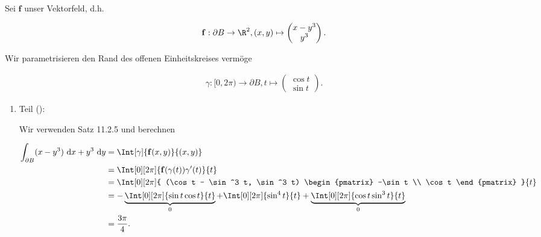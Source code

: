 \begin{solution}

Sei $\mathbf f$ unser Vektorfeld, d.h.

\begin{align*}
    \mathbf f:
        \partial B \to \R^2,
        (x, y)
        \mapsto
        \begin{pmatrix}
            x - y^3 \\ y^3
        \end{pmatrix}.
\end{align*}

Wir parametrisieren den Rand des offenen Einheitskreises vermöge

\begin{align*}
    \gamma:
        [0, 2 \pi) \to \partial B,
        t
        \mapsto
        \begin{pmatrix}
            \cos t \\ \sin t
        \end{pmatrix}.
\end{align*}

\begin{enumerate}[label = \arabic*.]

    \item Teil ():
    
    
    Wir verwenden Satz 11.2.5 und berechnen

    \begin{align*}
        \int_{\partial B}
        (x - y^3)
        ~\mathrm d x
    +
    y^3
    ~\mathrm d y
    & =
    \Int[\gamma]
    {
        \mathbf f(x, y)
    }{(x, y)} \\
    & =
    \Int[0][2 \pi]
    {
        \mathbf f(\gamma(t)) \gamma^\prime(t)
    }{t} \\
    & =
    \Int[0][2 \pi]
    {
        (\cos t - \sin^3 t, \sin^3 t)
        \begin{pmatrix}
            -\sin t \\
             \cos t
        \end{pmatrix}
        }{t} \\
        & =
        -
        \underbrace
        {
            \Int[0][2 \pi]
            {
                \sin t \cos t
            }{t}
        }_0
        +
        \Int[0][2 \pi]
        {
            \sin^4 t
        }{t}
        +
        \underbrace
        {
            \Int[0][2 \pi]
            {
                \cos t \sin^3 t
            }{t}
        }_0 \\
        & =
        \frac{3 \pi}{4}.
    \end{align*}


\end{enumerate}
\end{solution}
